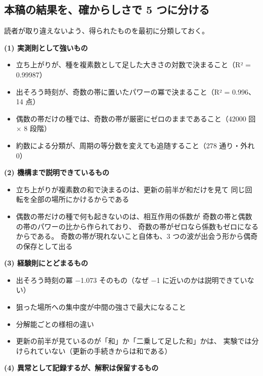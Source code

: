 \documentclass[
]{ltjsarticle}
\providecommand{\tightlist}{%
  \setlength{\itemsep}{0pt}\setlength{\parskip}{0pt}}
\begin{document}
\subsection{本稿の結果を、確からしさで 5
つに分ける}\label{ux672cux7a3fux306eux7d50ux679cux3092ux78baux304bux3089ux3057ux3055ux3067-5-ux3064ux306bux5206ux3051ux308b}

読者が取り違えないよう、得られたものを最初に分類しておく。

\textbf{(1) 実測則として強いもの}

\begin{itemize}
\tightlist
\item
  立ち上がりが、種を複素数として足した大きさの対数で決まること（R² =
  0.99987）
\item
  出そろう時刻が、奇数の帯に置いたパワーの冪で決まること（R² = 0.996、14
  点）
\item
  偶数の帯だけの種では、奇数の帯が厳密にゼロのままであること（42000 回 ×
  8 段階）
\item
  約数による分類が、周期の等分数を変えても追随すること（278 通り・外れ
  0）
\end{itemize}

\textbf{(2) 機構まで説明できているもの}

\begin{itemize}
\tightlist
\item
  立ち上がりが複素数の和で決まるのは、更新の前半が和だけを見て
  同じ回転を全部の場所にかけるからである
\item
  偶数の帯だけの種で何も起きないのは、相互作用の係数が
  奇数の帯と偶数の帯のパワーの比から作られており、
  奇数の帯がゼロなら係数もゼロになるからである。
  奇数の帯が現れないこと自体も、3
  つの波が出会う形から偶奇の保存として出る
\end{itemize}

\textbf{(3) 経験則にとどまるもの}

\begin{itemize}
\tightlist
\item
  出そろう時刻の冪 −1.073 そのもの（なぜ −1
  に近いのかは説明できていない）
\item
  狙った場所への集中度が中間の強さで最大になること
\item
  分解能ごとの様相の違い
\item
  更新の前半が見ているのが「和」か「二乗して足した和」かは、
  実験では分けられていない（更新の手続きからは和である）
\end{itemize}

\textbf{(4) 異常として記録するが、解釈は保留するもの}
\end{document}
